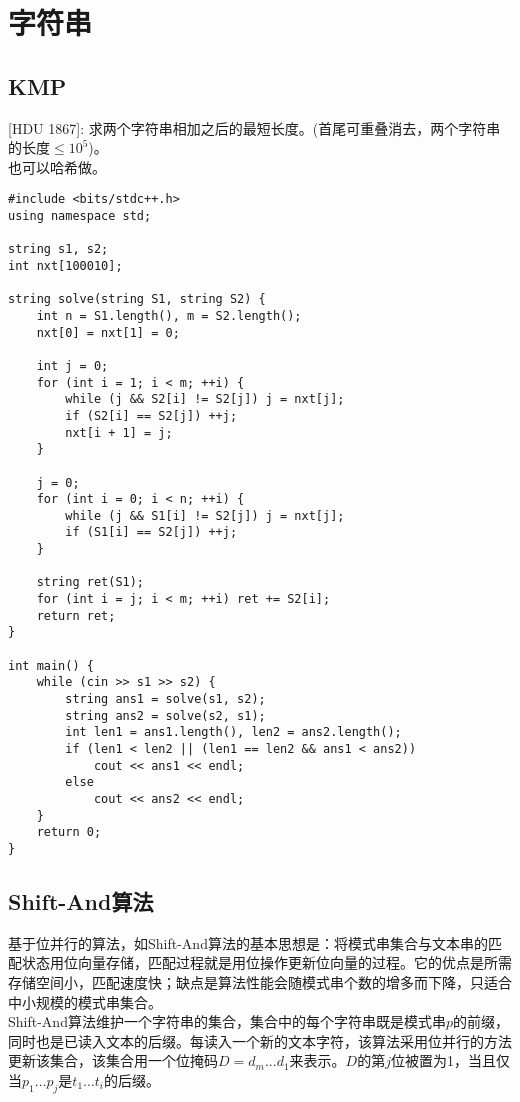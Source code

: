 %

%

\chapter{字符串}

\section{KMP}
[HDU 1867]: 求两个字符串相加之后的最短长度。(首尾可重叠消去，两个字符串的长度$\leq 10^5$)。\\
也可以哈希做。
\begin{lstlisting}
#include <bits/stdc++.h>
using namespace std;

string s1, s2;
int nxt[100010];

string solve(string S1, string S2) {
    int n = S1.length(), m = S2.length();
    nxt[0] = nxt[1] = 0;

    int j = 0;
    for (int i = 1; i < m; ++i) {
        while (j && S2[i] != S2[j]) j = nxt[j];
        if (S2[i] == S2[j]) ++j;
        nxt[i + 1] = j;
    }

    j = 0;
    for (int i = 0; i < n; ++i) {
        while (j && S1[i] != S2[j]) j = nxt[j];
        if (S1[i] == S2[j]) ++j;
    }

    string ret(S1);
    for (int i = j; i < m; ++i) ret += S2[i];
    return ret;
}

int main() {
    while (cin >> s1 >> s2) {
        string ans1 = solve(s1, s2);
        string ans2 = solve(s2, s1);
        int len1 = ans1.length(), len2 = ans2.length();
        if (len1 < len2 || (len1 == len2 && ans1 < ans2))
            cout << ans1 << endl;
        else
            cout << ans2 << endl;
    }
    return 0;
}
\end{lstlisting}

\clearpage
\section{Shift-And算法}

基于位并行的算法，如Shift-And算法的基本思想是：将模式串集合与文本串的匹配状态用位向量存储，匹配过程就是用位操作更新位向量的过程。它的优点是所需存储空间小，匹配速度快；缺点是算法性能会随模式串个数的增多而下降，只适合中小规模的模式串集合。\\

Shift-And算法维护一个字符串的集合，集合中的每个字符串既是模式串$p$的前缀，同时也是已读入文本的后缀。每读入一个新的文本字符，该算法采用位并行的方法更新该集合，该集合用一个位掩码$D=d_{m}...d_1$来表示。$D$的第$j$位被置为1，当且仅当$p_{1}…p_{j}$是$t_{1}…t_{i}$的后缀。 \\


